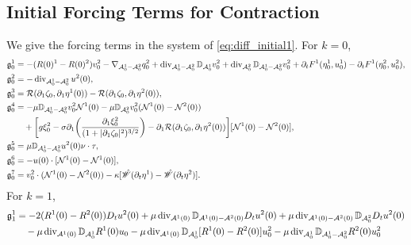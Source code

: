 \documentclass[letterpaper,reqno,10pt,twoside]{amsart}
\theoremstyle{definition}
\theoremstyle{remark}
\def\p{\partial}
\def\dive{\mathop{\rm div}\nolimits}
\begin{document}
\begin{appendix}
			
			\subsection{Initial Forcing Terms for Contraction}\label{sec:initial_forcing}
			
			
			We give the forcing terms in the system of \eqref{eq:diff_initial1}. For $k=0$,
			\[
			\begin{aligned}
				\mathfrak{g}^1_0&=-(R(0)^1-R(0)^2)v_0^2-\nabla_{\mathcal{A}_0^1-\mathcal{A}_0^2}q_0^2+\dive_{\mathcal{A}_0^1-\mathcal{A}_0^2}\mathbb{D}_{\mathcal{A}_0^1}v_0^2+\dive_{\mathcal{A}_0^2}\mathbb{D}_{\mathcal{A}_0^1-\mathcal{A}_0^2}v_0^2+\p_tF^1(\eta^1_0, u^1_0)- \p_tF^1(\eta^2_0, u^2_0),\\
				\mathfrak{g}^2_0&=-\dive_{\mathcal{A}_0^1-\mathcal{A}_0^2}u^2(0),\\
				\mathfrak{g}^3_0&=\mathcal{R}(\p_1\zeta_0, \p_1\eta^1(0))-\mathcal{R}(\p_1\zeta_0, \p_1\eta^2(0)),\\
				\mathfrak{g}^4_0&=-\mu\mathbb{D}_{\mathcal{A}_0^1-\mathcal{A}_0^2}v_0^2\mathcal{N}^1(0)-\mu\mathbb{D}_{\mathcal{A}_0^2}v_0^2(\mathcal{N}^1(0)-\mathcal{N}^2(0))\\
				&\quad+\bigg[g\xi_0^2-\sigma\p_1\bigg(\frac{\p_1\xi_0^2}{(1+|\p_1\zeta_0|^2)^{3/2}}\bigg)-\p_1 \mathcal{R}(\p_1\zeta_0,\p_1\eta^2(0))\bigg][\mathcal{N}^1(0)-\mathcal{N}^2(0)],\\
				\mathfrak{g}^5_0&=\mu\mathbb{D}_{\mathcal{A}_0^1-\mathcal{A}_0^2}u^2(0)\nu\cdot\tau,\\
				\mathfrak{g}^6_0&=-u(0)\cdot[\mathcal{N}^1(0)-\mathcal{N}^1(0)],\\
				\mathfrak{g}^7_0&=v_0^2\cdot(\mathcal{N}^1(0)-\mathcal{N}^2(0))-\kappa[\hat{\mathscr{W}}(\p_t\eta^1)-\hat{\mathscr{W}}(\p_t\eta^2)].
			\end{aligned}
			\]
			For $k=1$,
			\[
			\begin{aligned}
				\mathfrak{g}^1_1&=-2(R^1(0)-R^2(0))D_tu^2(0)+\mu\dive_{\mathcal{A}^1(0)}\mathbb{D}_{\mathcal{A}^1(0)-\mathcal{A}^2(0)}D_tu^2(0)+\mu\dive_{\mathcal{A}^1(0)-\mathcal{A}^2(0)}\mathbb{D}_{\mathcal{A}^2_0}D_tu^2(0)\\
				&\quad-\mu\dive_{\mathcal{A}^1(0)}\mathbb{D}_{\mathcal{A}^1_0}R^1(0)u_0-\mu\dive_{\mathcal{A}^1(0)}\mathbb{D}_{\mathcal{A}^1_0}[R^1(0)-R^2(0)]u^2_0-\mu\dive_{\mathcal{A}^1_0}\mathbb{D}_{\mathcal{A}^1_0-\mathcal{A}^2_0}R^2(0)u^2_0\\

\end{aligned}\]
\end{appendix}
\end{document}
